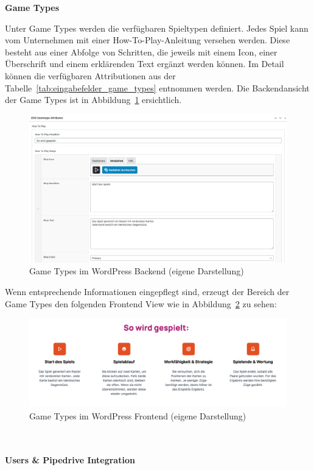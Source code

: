 \newpage
\textbf{Game Types}

Unter Game Types werden die verfügbaren Spieltypen definiert.
Jedes Spiel kann vom Unternehmen mit einer \glqq How-To-Play\grqq{}-Anleitung versehen werden.
Diese besteht aus einer Abfolge von Schritten, die jeweils mit einem Icon, einer Überschrift und einem erklärenden Text ergänzt werden können.
Im Detail können die verfügbaren Attributionen aus der Tabelle~\ref{tab:eingabefelder_game_types} entnommen werden.
Die Backendansicht der Game Types ist in Abbildung~\ref{fig:game-types-settings-legacy} ersichtlich.
\begin{figure}[H]
    \centering
    \includegraphics[width=1\textwidth]{images/legacy_game_types_backend}
    \caption{Game Types im WordPress Backend (eigene Darstellung)}
    \label{fig:game-types-settings-legacy}
\end{figure}
Wenn entsprechende Informationen eingepflegt sind, erzeugt der Bereich der Game Types den folgenden Frontend View wie in Abbildung~\ref{fig:game-types-frontend-legacy} zu sehen:
\begin{figure}[H]
    \centering
    \includegraphics[width=1\textwidth]{images/legacy_game_types_frontend}
    \caption{Game Types im WordPress Frontend (eigene Darstellung)}
    \label{fig:game-types-frontend-legacy}
\end{figure}
\\\\
\textbf{Users \& Pipedrive Integration}

